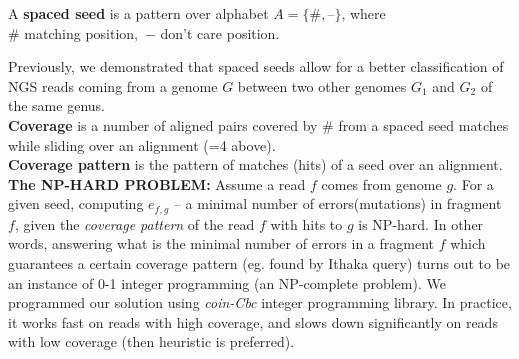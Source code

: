 \documentclass[portrait,final,a0paper,fontscale=0.277]{baposter}
\begin{document}
\begin{poster}
{  A {\bf spaced seed} is a pattern over alphabet 
  $A=\{\textbf{\#}, \textbf{--}\}$, where\\
  $\#$ matching position,\, $-$ don't care position.
\vspace{-0.5em}  
\vspace{-0.8em}

Previously, we demonstrated that spaced seeds allow for a better
   classification of NGS reads coming from a genome $G$ between two
  other genomes $G_1$ and $G_2$ of the same genus.\cite{sseed}
\\  
 {\bf Coverage} is a number of aligned pairs covered 
 by $\textbf{\#}$ from a spaced seed matches while sliding over an alignment 
 (=4 above). 
 \\
{\bf Coverage pattern} is the pattern of matches (hits) of a seed over an alignment.
\\
{\bf The NP-HARD PROBLEM:}  Assume a read $f$ comes from genome $g$.
For a given seed, computing $e_{f,g}$ -- a minimal number of errors(mutations) in fragment $f$, given the {\em coverage pattern} of the read $f$ with hits to $g$ is NP-hard. In other words, answering what is the minimal number of errors in a fragment $f$ which guarantees a certain coverage pattern (eg. found by Ithaka query) turns out to be an instance of 0-1 integer programming (an NP-complete problem). We programmed our solution using {\em coin-Cbc} integer programming library. In practice, it works fast on reads with high coverage, and slows down significantly on reads with low coverage (then heuristic is preferred).
   \vspace{0.3em}
  }


\end{poster}
\end{document}
